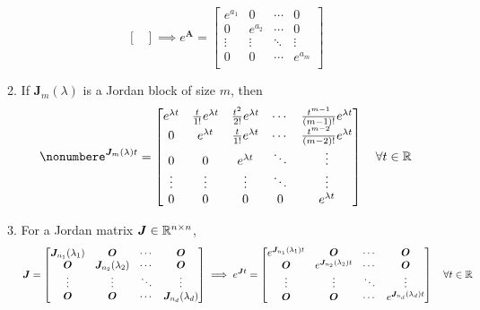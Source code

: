 \documentclass[12pt,a4paper]{article}
\begin{document}
\begin{itemize}
\begin{enumerate}
\begin{equation}
\begin{bmatrix}
        \end{bmatrix}
        \implies
        e^{\bm{A}} = 
        \begin{bmatrix}
          e^{a_{1}} & 0 & \cdots & 0 \\
          0 & e^{a_{2}} & \cdots & 0 \\
          \vdots & \vdots & \ddots & \vdots \\
          0 & 0 & \cdots & e^{a_{m}} \\
        \end{bmatrix}
      \end{equation}
    \item If $\bm{J}_{m}(\lambda)$ is a Jordan block of size $m$, then
      \begin{equation}\nonumber%
        e^{\bm{J}_{m}(\lambda)t}
        =
        \begin{bmatrix}
          e^{\lambda t} & \frac{t}{1!}e^{\lambda t} & \frac{t^{2}}{2!}e^{\lambda t} & \cdots & \frac{t^{m-1}}{(m-1)!}e^{\lambda t} \\
          0 & e^{\lambda t} & \frac{t}{1!}e^{\lambda t} & \cdots & \frac{t^{m-2}}{(m-2)!}e^{\lambda t} \\
          0 & 0 & e^{\lambda t} & \ddots & \vdots \\
          \vdots & \vdots & \vdots & \ddots & \vdots \\
          0 & 0 & 0  & 0 & e^{\lambda t} \\
        \end{bmatrix}
        \quad \forall t \in \R
      \end{equation}
    \item For a Jordan matrix $\bm{J}\in \mathbb{R}^{n\times n}$,
    \begin{equation}\nonumber%
      \bm{J} =
      \begin{bmatrix}
        \bm{J}_{n_{1}}(\lambda_{1}) & \bm{O} & \cdots & \bm{O} \\
        \bm{O} & \bm{J}_{n_{2}}(\lambda_{2}) & \cdots & \bm{O} \\
        \vdots & \vdots & \ddots & \vdots \\
        \bm{O} & \bm{O} & \cdots & \bm{J}_{n_{d}}(\lambda_{d}) \\
      \end{bmatrix}
      \implies
      e^{\bm{J}t}
      =
      \begin{bmatrix}
        e^{\bm{J}_{n_{1}}(\lambda_{1})t} & \bm{O} & \cdots & \bm{O} \\
        \bm{O} & e^{\bm{J}_{n_{2}}(\lambda_{2})t} & \cdots & \bm{O} \\
        \vdots & \vdots & \ddots & \vdots \\
        \bm{O} & \bm{O} & \cdots & e^{\bm{J}_{n_{d}}(\lambda_{d})t} \\
      \end{bmatrix}
      \quad \forall t \in \R
    \end{equation}


\end{enumerate}
\end{itemize}
\end{document}
